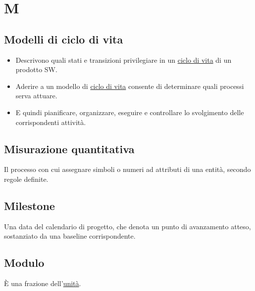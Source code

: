 \section{M}

    \subsection{Modelli di ciclo di vita}
    \label{glossario:modellidiciclodivita}
    \begin{itemize}
        \item Descrivono quali stati e transizioni privilegiare in un \hyperref[glossario:ciclodivita]{ciclo di vita} di un prodotto SW.
        \item Aderire a un modello di \hyperref[glossario:ciclodivita]{ciclo di vita} consente di determinare quali processi serva attuare.
        \item E quindi pianificare, organizzare, eseguire e controllare lo svolgimento delle corrispondenti attività.
    \end{itemize}

    \subsection{Misurazione quantitativa}
    \label{glossario:misurazionequantitativa}
    Il processo con cui assegnare simboli o numeri ad attributi di una entità, secondo regole definite.

    \subsection{Milestone}
    \label{glossario:milestone}
    Una data del calendario di progetto, che denota un punto di avanzamento atteso, sostanziato da una baseline corrispondente.

    \subsection{Modulo}
    \label{glossario:modulo}
    È una frazione dell'\hyperref[glossario:unita]{unità}.

\pagebreak
